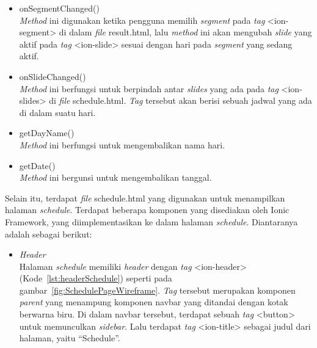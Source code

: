 \begin{itemize}
	\begin{itemize}
		\item onSegmentChanged() \\
		\textit{Method} ini digunakan ketika pengguna memilih \textit{segment} pada \textit{tag} <ion-segment> di dalam \textit{file} result.html, lalu \textit{method} ini akan mengubah \textit{slide} yang aktif pada \textit{tag} <ion-slide> sesuai dengan hari pada \textit{segment} yang sedang aktif. 
		\item onSlideChanged() \\
		\textit{Method} ini berfungsi untuk berpindah antar \textit{slides} yang ada pada \textit{tag} <ion-slides> di \textit{file} schedule.html. \textit{Tag} tersebut akan berisi sebuah jadwal yang ada di dalam suatu hari.
		\item getDayName() \\
		\textit{Method} ini berfungsi untuk mengembalikan nama hari.
		\item getDate() \\
		\textit{Method} ini bergunsi untuk mengembalikan tanggal.
	\end{itemize}
	
	Selain itu, terdapat \textit{file} schedule.html yang digunakan untuk menampilkan halaman \textit{schedule}. Terdapat beberapa komponen yang disediakan oleh Ionic Framework, yang diimplementasikan ke dalam halaman \textit{schedule}. Diantaranya adalah sebagai berikut:
	
	\begin{itemize}
		\item \textit{Header} \\
		Halaman \textit{schedule} memiliki \textit{header} dengan \textit{tag} <ion-header> (Kode~\ref{lst:headerSchedule}) seperti pada gambar~\ref{fig:SchedulePageWireframe}. \textit{Tag} tersebut merupakan komponen \textit{parent} yang menampung komponen navbar yang ditandai dengan kotak berwarna biru. Di dalam navbar tersebut, terdapat sebuah \textit{tag} <button> untuk memunculkan \textit{sidebar}. Lalu terdapat \textit{tag} <ion-title> sebagai judul dari halaman, yaitu ``Schedule''.
		

\end{itemize}
\end{itemize}
